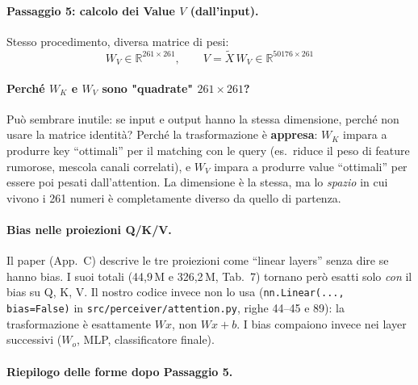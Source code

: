 \documentclass[
  11pt,
]{article}
\begin{document}
\paragraph{Passaggio 5: calcolo dei Value $V$ (dall'input).} Stesso procedimento, diversa matrice di pesi:
\[
W_V \in \mathbb{R}^{261 \times 261}, \qquad V = \tilde{X}\, W_V \in \mathbb{R}^{50176 \times 261}
\]

\paragraph{Perché $W_K$ e $W_V$ sono "quadrate" $261 \times 261$?} Può sembrare inutile: se input e output hanno la stessa dimensione, perché non usare la matrice identità? Perché la trasformazione è \textbf{appresa}: $W_K$ impara a produrre key ``ottimali'' per il matching con le query (es.\ riduce il peso di feature rumorose, mescola canali correlati), e $W_V$ impara a produrre value ``ottimali'' per essere poi pesati dall'attention. La dimensione è la stessa, ma lo \emph{spazio} in cui vivono i 261 numeri è completamente diverso da quello di partenza.

\paragraph{Bias nelle proiezioni Q/K/V.} Il paper (App.\ C) descrive le tre proiezioni come ``linear layers'' senza dire se hanno bias. I suoi totali (44,9\,M e 326,2\,M, Tab.~7) tornano però esatti solo \emph{con} il bias su Q, K, V. Il nostro codice invece non lo usa (\texttt{nn.Linear(..., bias=False)} in \texttt{src/perceiver/attention.py}, righe 44--45 e 89): la trasformazione è esattamente $W x$, non $W x + b$. I bias compaiono invece nei layer successivi ($W_o$, MLP, classificatore finale).

\paragraph{Riepilogo delle forme dopo Passaggio 5.}
\end{document}
